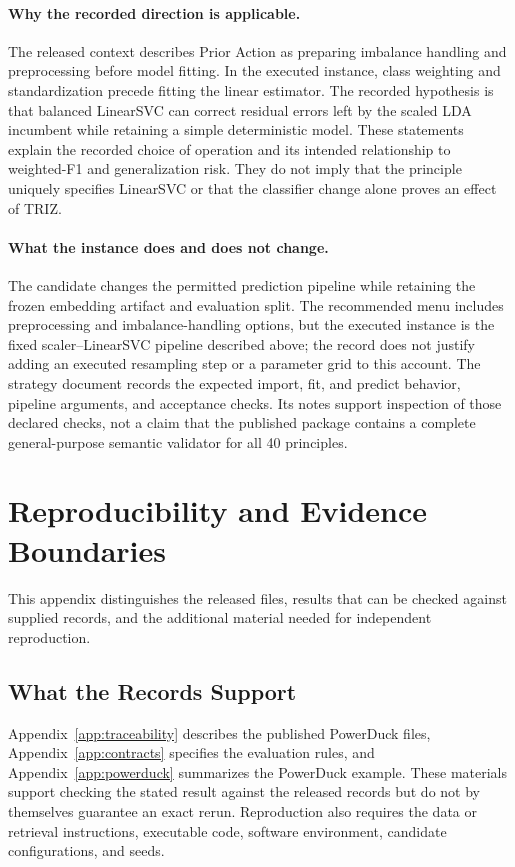 \documentclass[manuscript,screen,nonacm]{acmart}
\begin{document}
\paragraph{Why the recorded direction is applicable.}
The released context describes Prior Action as preparing imbalance handling and preprocessing before model fitting. In the executed instance, class weighting and standardization precede fitting the linear estimator. The recorded hypothesis is that balanced LinearSVC can correct residual errors left by the scaled LDA incumbent while retaining a simple deterministic model. These statements explain the recorded choice of operation and its intended relationship to weighted-F1 and generalization risk. They do not imply that the principle uniquely specifies LinearSVC or that the classifier change alone proves an effect of TRIZ.

\paragraph{What the instance does and does not change.}
The candidate changes the permitted prediction pipeline while retaining the frozen embedding artifact and evaluation split. The recommended menu includes preprocessing and imbalance-handling options, but the executed instance is the fixed scaler--LinearSVC pipeline described above; the record does not justify adding an executed resampling step or a parameter grid to this account. The strategy document records the expected import, fit, and predict behavior, pipeline arguments, and acceptance checks. Its notes support inspection of those declared checks, not a claim that the published package contains a complete general-purpose semantic validator for all 40 principles.

\section{Reproducibility and Evidence Boundaries}
\label{app:reproducibility}

This appendix distinguishes the released files, results that can be checked against supplied records, and the additional material needed for independent reproduction.

\subsection{What the Records Support}

Appendix~\ref{app:traceability} describes the published PowerDuck files,
Appendix~\ref{app:contracts} specifies the evaluation rules, and
Appendix~\ref{app:powerduck} summarizes the PowerDuck example.
These materials support checking the stated result against the released
records but do not by themselves guarantee an exact rerun.
Reproduction also requires the data or retrieval instructions, executable
code, software environment, candidate configurations, and seeds.
\end{document}
